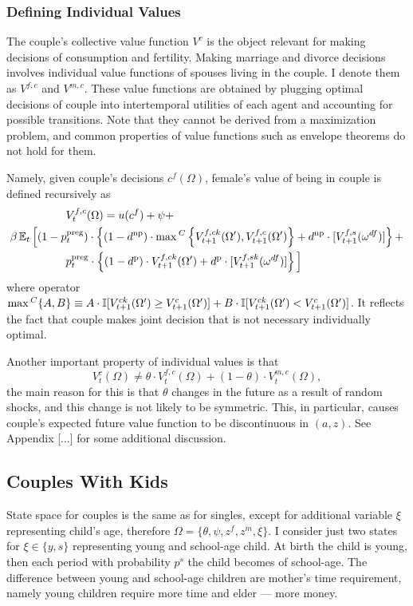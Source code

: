 \subsubsection{Defining Individual Values}
The couple's collective value function $V^c$ is the object relevant for making decisions of consumption and fertility. Making marriage and divorce decisions involves individual value functions of spouses living in the couple. I denote them as $V^{f,c}$ and $V^{m,c}$. These value functions are obtained by plugging optimal decisions of couple into intertemporal utilities of each agent and accounting for possible transitions. Note that they cannot be derived from a maximization problem, and common properties of value functions such as envelope theorems do not hold for them.

Namely, given couple's decisions $c^f(\Omega)$, female's value of being in couple is defined recursively as
\begin{align}
& \hspace{5em}  V^{f,c}_t(\Omega) =    u(c^f) + \psi +  \\   \nonumber
 &  \beta \operatorname{\mathbb{E}}_t \Big[   (1 - p^{\text{preg}}_t)\cdot \left\{ (1-d^{\text{np}})\cdot \max{}^C \left\{ V^{f,ck}_{t+1}(\Omega'),V^{f,c}_{t+1}(\Omega')\right\} + d^{\text{np}}\cdot [ V_{t+1}^{f,s}(\omega^{df})]\right\}  +  \\  \nonumber
& \hspace{5em} p^{\text{preg}}_t\cdot \left\{ (1-d^{\text{p}})\cdot V^{f,ck}_{t+1}(\Omega') + d^{\text{p}}\cdot [ V_{t+1}^{f,sk}(\omega^{df}) ]\right\} \Big] 
\end{align}
where operator $\max{}^C\{A,B\} \equiv A\cdot \mathbb{I}[V^{ck}_{t+1}(\Omega')\geq V^{c}_{t+1}(\Omega')] + B\cdot \mathbb{I}[V^{ck}_{t+1}(\Omega')< V^{c}_{t+1}(\Omega')]$. It reflects the fact that couple makes joint decision that is not necessary individually optimal.

Another important property of individual values is that
\begin{equation} V^{c}_t(\Omega) \neq \theta\cdot V^{f,c}_t(\Omega) + (1-\theta)\cdot V^{m,c}_t(\Omega),\label{tht_noneq}\end{equation}
the main reason for this is that $\theta$ changes in the future as a result of random shocks, and this change is not likely to be symmetric. This, in particular, causes couple's expected future value function to be discontinuous in $(a,z)$. See Appendix [...] for some additional discussion.

\subsection{Couples With Kids}
State space for couples is the same as for singles, except for additional variable $\xi$ representing child's age, therefore $\Omega = \{\theta,\psi,z^f,z^m,\xi\}$. I consider just two states for $\xi \in \{y,s\}$ representing young and school-age child. At birth the child is young, then each period with probability $p^{s}$ the child becomes of school-age. The difference between young and school-age children are mother's time requirement, namely young children require more time and elder --- more money.

